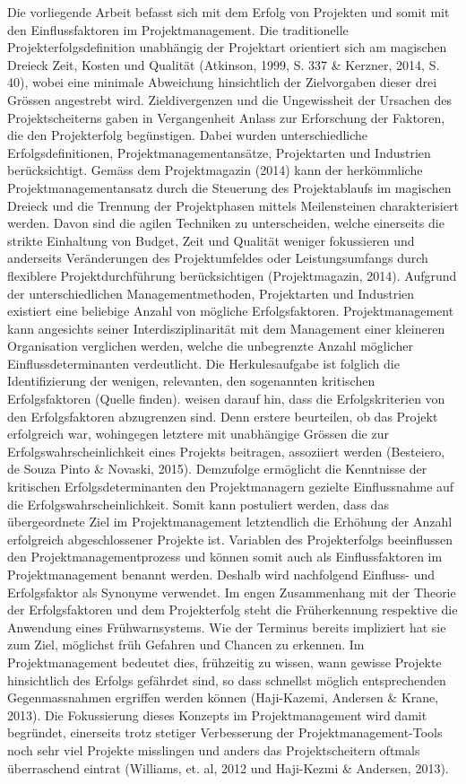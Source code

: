  Die vorliegende Arbeit befasst sich mit dem Erfolg von Projekten und somit mit den Einflussfaktoren im Projektmanagement. Die traditionelle Projekterfolgsdefinition unabhängig der Projektart orientiert sich am magischen Dreieck Zeit, Kosten und Qualität (Atkinson, 1999, S. 337 \& Kerzner, 2014, S. 40), wobei eine minimale Abweichung hinsichtlich der Zielvorgaben dieser drei Grössen angestrebt wird. Zieldivergenzen und die Ungewissheit der Ursachen des Projektscheiterns gaben in Vergangenheit Anlass zur Erforschung der Faktoren, die den Projekterfolg begünstigen. Dabei wurden unterschiedliche Erfolgsdefinitionen, Projektmanagementansätze, Projektarten und Industrien berücksichtigt. Gemäss dem Projektmagazin (2014) kann der herkömmliche Projektmanagementansatz durch die Steuerung des Projektablaufs im magischen Dreieck und die Trennung der Projektphasen mittels Meilensteinen charakterisiert werden. Davon sind die agilen Techniken zu unterscheiden, welche einerseits die strikte Einhaltung von Budget, Zeit und Qualität weniger fokussieren und anderseits Veränderungen des Projektumfeldes oder Leistungsumfangs durch flexiblere Projektdurchführung berücksichtigen (Projektmagazin, 2014). Aufgrund der unterschiedlichen Managementmethoden, Projektarten und Industrien existiert eine beliebige Anzahl von mögliche Erfolgsfaktoren. Projektmanagement kann angesichts seiner Interdisziplinarität mit dem Management einer kleineren Organisation verglichen werden, welche die unbegrenzte Anzahl möglicher Einflussdeterminanten verdeutlicht. Die Herkulesaufgabe ist folglich die Identifizierung der wenigen, relevanten, den sogenannten kritischen Erfolgsfaktoren (Quelle finden). \cite{BeDeNov2015} weisen darauf hin, dass die Erfolgskriterien von den Erfolgsfaktoren abzugrenzen sind. Denn erstere beurteilen, ob das Projekt erfolgreich war, wohingegen letztere mit unabhängige Grössen die zur Erfolgswahrscheinlichkeit eines Projekts beitragen, assoziiert werden (Besteiero, de Souza Pinto \& Novaski, 2015). Demzufolge ermöglicht die Kenntnisse der kritischen Erfolgsdeterminanten den Projektmanagern gezielte Einflussnahme auf die Erfolgswahrscheinlichkeit. Somit kann postuliert werden, dass das übergeordnete Ziel im Projektmanagement letztendlich die Erhöhung der Anzahl erfolgreich abgeschlossener Projekte ist. Variablen des Projekterfolgs beeinflussen den Projektmanagementprozess und können somit auch als Einflussfaktoren im Projektmanagement benannt werden. Deshalb wird nachfolgend Einfluss- und Erfolgsfaktor als Synonyme verwendet. Im engen Zusammenhang mit der Theorie der Erfolgsfaktoren und dem Projekterfolg steht die Früherkennung respektive die Anwendung eines Frühwarnsystems. Wie der Terminus bereits impliziert hat sie zum Ziel, möglichst früh Gefahren und Chancen zu erkennen. Im Projektmanagement bedeutet dies, frühzeitig zu wissen, wann gewisse Projekte hinsichtlich des Erfolgs gefährdet sind, so dass schnellst möglich entsprechenden Gegenmassnahmen ergriffen werden können (Haji-Kazemi, Andersen \& Krane, 2013). Die Fokussierung dieses Konzepts im Projektmanagement wird damit begründet, einerseits trotz stetiger Verbesserung der Projektmanagement-Tools noch sehr viel Projekte misslingen und anders das Projektscheitern oftmals überraschend eintrat (Williams, et. al, 2012 und Haji-Kezmi \& Andersen, 2013). 
